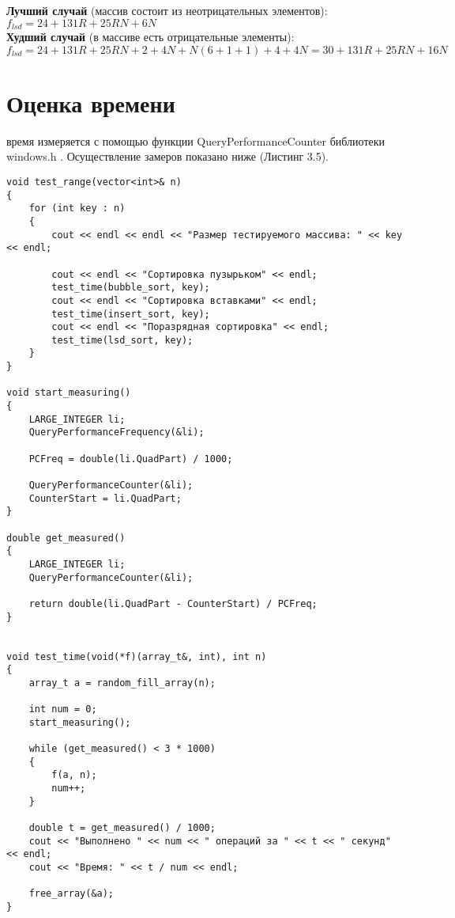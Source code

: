 \textbf{Лучший случай} (массив состоит из неотрицательных элементов):\\
$f_{lsd} = 24 + 131R + 25RN + 6N$\\

\textbf{Худший случай} (в массиве есть отрицательные элементы):\\
$f_{lsd} = 24 + 131R + 25RN + 2 + 4N + N(6 + 1 + 1) + 4 + 4N = 30 + 131R + 25RN + 16N$\\

\section{Оценка времени}
 время измеряется с помощью функции QueryPerformanceCounter библиотеки windows.h \cite{Query}. Осуществление замеров показано ниже (Листинг 3.5).
\begin{lstlisting}[label=code, caption = Замеры процессорного времени]
void test_range(vector<int>& n)
{
	for (int key : n)
	{
		cout << endl << endl << "Размер тестируемого массива: " << key << endl;
		
		cout << endl << "Сортировка пузырьком" << endl;
		test_time(bubble_sort, key);
		cout << endl << "Сортировка вставками" << endl;
		test_time(insert_sort, key);
		cout << endl << "Поразрядная сортировка" << endl;
		test_time(lsd_sort, key);
	}
}

void start_measuring()
{
	LARGE_INTEGER li;
	QueryPerformanceFrequency(&li);
	
	PCFreq = double(li.QuadPart) / 1000;
	
	QueryPerformanceCounter(&li);
	CounterStart = li.QuadPart;
}

double get_measured()
{
	LARGE_INTEGER li;
	QueryPerformanceCounter(&li);
	
	return double(li.QuadPart - CounterStart) / PCFreq;
}


void test_time(void(*f)(array_t&, int), int n)
{
	array_t a = random_fill_array(n);
	
	int num = 0;
	start_measuring();
	
	while (get_measured() < 3 * 1000)
	{
		f(a, n);
		num++;
	}
	
	double t = get_measured() / 1000;
	cout << "Выполнено " << num << " операций за " << t << " секунд" << endl;
	cout << "Время: " << t / num << endl;
	
	free_array(&a);
}
\end{lstlisting}